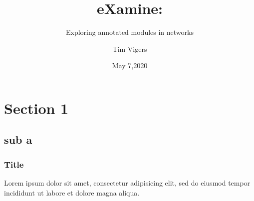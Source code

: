 \documentclass{beamer}
\title{eXamine:}
\subtitle{Exploring annotated modules in networks}
\author{Tim Vigers}
\institute{University of Colorado Denver}
\date{May 7,2020}
\begin{document}
\begin{frame}
\titlepage
\end{frame}

\section{Section 1}
\subsection{sub a}

\begin{frame}
\frametitle{Title}
Lorem ipsum dolor sit amet, consectetur adipisicing elit, sed do eiusmod tempor incididunt ut labore et dolore magna aliqua.
\end{frame}
\end{document}
